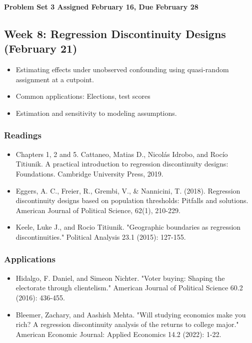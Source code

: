 \documentclass[11pt, article, oneside]{memoir}
\theoremstyle{Assumption}
\begin{document}
\textbf{Problem Set 3 Assigned February 16, Due February 28}

\subsection{Week 8: Regression Discontinuity Designs (February 21)}

\begin{itemize}
\item Estimating effects under unobserved confounding using quasi-random assignment at a cutpoint.
\item Common applications: Elections, test scores
\item Estimation and sensitivity to modeling assumptions.
\end{itemize}

\subsubsection*{Readings}

\begin{itemize}
\item Chapters 1, 2 and 5. Cattaneo, Matias D., Nicolás Idrobo, and Rocío Titiunik. A practical introduction to regression discontinuity designs: Foundations. Cambridge University Press, 2019.
\item Eggers, A. C., Freier, R., Grembi, V., \& Nannicini, T. (2018). Regression discontinuity designs based on population thresholds: Pitfalls and solutions. American Journal of Political Science, 62(1), 210-229.
\item Keele, Luke J., and Rocio Titiunik. "Geographic boundaries as regression discontinuities." Political Analysis 23.1 (2015): 127-155.
\end{itemize}

\subsubsection*{Applications}

\begin{itemize}
\item Hidalgo, F. Daniel, and Simeon Nichter. "Voter buying: Shaping the electorate through clientelism." American Journal of Political Science 60.2 (2016): 436-455.
\item Bleemer, Zachary, and Aashish Mehta. "Will studying economics make you rich? A regression discontinuity analysis of the returns to college major." American Economic Journal: Applied Economics 14.2 (2022): 1-22.
\end{itemize}
\end{document}
